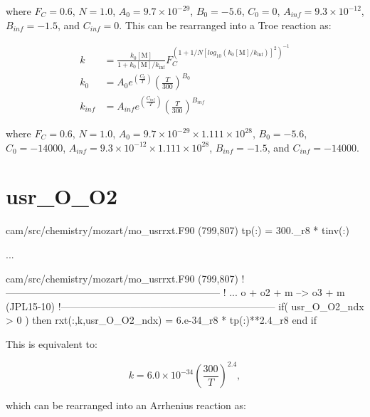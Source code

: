 \documentclass[titlepage]{article}
\begin{document}
\noindent where $F_C = 0.6$, $N = 1.0$, $A_0 = 9.7 \times 10^{-29}$, $B_0 = -5.6$, $C_0 = 0$, $A_{inf} = 9.3 \times 10^{-12}$, $B_{inf} = -1.5$, and $C_{inf} = 0$. This can be rearranged into a Troe reaction as:

\begin{equation}
\begin{split}
k & = \frac{k_0[\mbox{M}]}{1+k_0[\mbox{M}]/k_{\inf}}F_C^{(1+1/N[log_{10}(k_0[\mbox{M}]/k_{\inf})]^2)^{-1}} \\
k_0 & = A_0 e^{\left( \frac{C_0}{T} \right)} \left( \frac{T}{300} \right)^{B_0} \\
k_{inf} & = A_{inf} e^{\left( \frac{C_{inf}}{T} \right)} \left( \frac{T}{300} \right)^{B_{inf}}
\end{split}
\end{equation}

\noindent where $F_C = 0.6$, $N = 1.0$, $A_0 = 9.7 \times 10^{-29} \times 1.111 \times 10^{28}$, $B_0 = -5.6$, $C_0 = -14000$, $A_{inf} = 9.3 \times 10^{-12} \times 1.111 \times 10^{28}$, $B_{inf} = -1.5$, and $C_{inf} = -14000$.


\section{usr\_O\_O2}

\begin{blockcode}[commandchars=\\\{\}]
\color{gray}cam/src/chemistry/mozart/mo_usrrxt.F90 (799,807)
       tp(:)             = 300._r8 * tinv(:)

\color{gray}...

\color{gray}cam/src/chemistry/mozart/mo_usrrxt.F90 (799,807)
!-----------------------------------------------------------------
! ... o + o2 + m --> o3 + m (JPL15-10)
!-----------------------------------------------------------------
       if( usr_O_O2_ndx > 0 ) then
          rxt(:,k,usr_O_O2_ndx) = 6.e-34_r8 * tp(:)**2.4_r8
       end if
\end{blockcode}

This is equivalent to:

\begin{equation}
k = 6.0 \times 10^{-34} \left(\frac{300}{T}\right)^{2.4},
\end{equation}

\noindent which can be rearranged into an Arrhenius reaction as:
\end{document}
